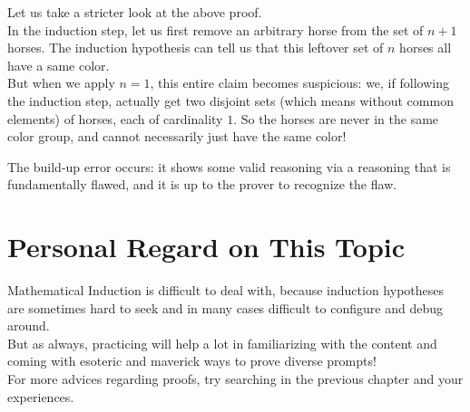 Let us take a stricter look at the above proof. \\
In the induction step, let us first remove an arbitrary horse from the set of $n + 1$ horses. The induction hypothesis can tell us that this leftover set of $n$ horses all have a same color. \\
But when we apply $n = 1$, this entire claim becomes suspicious: we, if following the induction step, actually get two disjoint sets (which means without common elements) of horses, each of cardinality $1$. So the horses are never in the same color group, and cannot necessarily just have the same color!

The build-up error occurs: it shows some valid reasoning via a reasoning that is fundamentally flawed, and it is up to the prover to recognize the flaw. 

\section{Personal Regard on This Topic}
Mathematical Induction is difficult to deal with, because induction hypotheses are sometimes hard to seek and in many cases difficult to configure and debug around. \\
But as always, practicing will help a lot in familiarizing with the content and coming with esoteric and maverick ways to prove diverse prompts! \\
For more advices regarding proofs, try searching in the previous chapter and your experiences.
